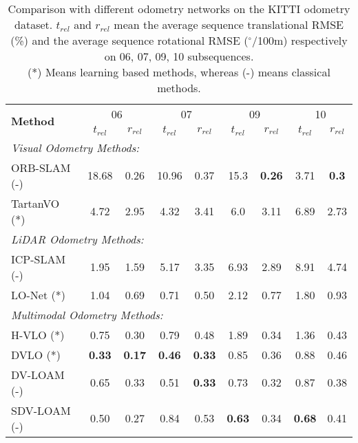 \begin{table*}[t]
  \centering
  \caption{Comparison with different odometry networks on the KITTI odometry dataset. $t_{rel}$ and $r_{rel}$ mean the average sequence translational RMSE (\%) and the average sequence rotational RMSE ($^{\circ}$/100m) respectively on 06, 07, 09, 10 subsequences.\\ (*) Means learning based methods, whereas (-) means classical methods.} 

    \begin{tabular}{lllll|cc|cc|cc|cc}
    \toprule
    \multicolumn{5}{l|}{\multirow{2}[0]{*}{\textbf{Method}}} & \multicolumn{2}{c|}{06} & \multicolumn{2}{c|}{07} & \multicolumn{2}{c|}{09} & \multicolumn{2}{c}{10} \\
         &      &      &      &      & $t_{rel}$ & $r_{rel}$ & $t_{rel}$ & $r_{rel}$ & $t_{rel}$ & $r_{rel}$ & $t_{rel}$ & $r_{rel}$\\
    \midrule
    \multicolumn{13}{l}{\it{Visual Odometry Methods:}} \\
    \midrule
    \multicolumn{5}{l|}{ORB-SLAM (-)} & 18.68 & 0.26 & 10.96 & 0.37 & 15.3 & \textbf{0.26} & 3.71 & \textbf{0.3}  \\
    \multicolumn{5}{l|}{TartanVO (*)} & 4.72 & 2.95 & 4.32 & 3.41 & 6.0 & 3.11 & 6.89 & 2.73 \\
    \midrule
    \multicolumn{13}{l}{\it{LiDAR Odometry Methods:}} \\
    \midrule
    \multicolumn{5}{l|}{ICP-SLAM (-)} & 1.95 & 1.59 & 5.17 & 3.35 & 6.93 & 2.89 & 8.91 & 4.74  \\
    \multicolumn{5}{l|}{LO-Net (*)} & 1.04 & 0.69 & 0.71 & 0.50 & 2.12 & 0.77 & 1.80 & 0.93 \\
    \midrule
    \multicolumn{13}{l}{\it{Multimodal Odometry Methods:}} \\
    \midrule
    \multicolumn{5}{l|}{H-VLO (*)} & 0.75 & 0.30 & 0.79 & 0.48 & 1.89 & 0.34 & 1.36 & 0.43 \\
    \multicolumn{5}{l|}{DVLO (*)} & \textbf{0.33} & \textbf{0.17} & \textbf{0.46} & \textbf{0.33} & 0.85 & 0.36 & 0.88 & 0.46 \\
    \multicolumn{5}{l|}{DV-LOAM (-)} & 0.65 & 0.33 & 0.51 & \textbf{0.33} & 0.73 & 0.32 & 0.87 & 0.38 \\
    \multicolumn{5}{l|}{SDV-LOAM (-)} & 0.50 & 0.27 & 0.84 & 0.53 & \textbf{0.63} & 0.34 & \textbf{0.68} & 0.41 \\
    
    \bottomrule
    \end{tabular}%
  \label{tab:evaluation_06_10}%
\end{table*}

